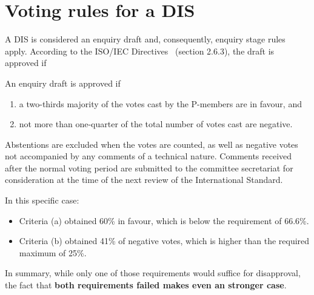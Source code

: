 \section{Voting rules for a DIS}

A DIS is considered an enquiry draft and, consequently, enquiry stage rules apply.
According to the ISO/IEC Directives~\cite{jtc1:directives} (section 2.6.3),
the draft is approved if

\vspace{1em}
\begin{tcolorbox}[
  colback=blue!8!white,
  colframe=blue,
  title={\textbf{Section 2.6.3 from ISO/IEC JTC1 Directives}},
  breakable,
  width=\textwidth,
  boxrule=0.5pt
  ]
An enquiry draft is approved if

\begin{enumerate}[label=(\alph*)]

\item
a two-thirds majority of the votes cast by the P-members are in favour, and

\item
not more than one-quarter of the total number of votes cast are negative.

\end{enumerate}

Abstentions are excluded when the votes are counted, as well as negative votes
not accompanied by any comments of a technical nature. Comments received after
the normal voting period are submitted to the committee secretariat for
consideration at the time of the next review of the International Standard.
\end{tcolorbox}

\vspace{1em}
\begin{tcolorbox}[
  colback=red!8!white,
  colframe=red,
  title={\textbf{Results for DIS 14882 (Ed. 8)}},
  breakable,
  width=\textwidth,
  boxrule=0.5pt
  ]
In this specific case:

\begin{itemize}

\item
Criteria (a) obtained 60\% in favour, which is below the
requirement of 66.6\%. 

\item
Criteria (b) obtained 41\% of negative votes,
which is higher than the required maximum of 25\%. 
\end{itemize}

In summary, while only one of those requirements would suffice for disapproval,
the fact that \textbf{both requirements failed makes even an stronger case}.
\end{tcolorbox}

